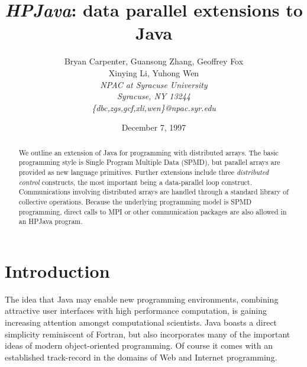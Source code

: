 






\pagestyle{plain}

\title{{\em HPJava}: data parallel extensions to Java}

\author{Bryan Carpenter, Guansong Zhang, Geoffrey Fox \\
        Xinying Li, Yuhong Wen\vspace{5mm} \\
        \em NPAC at Syracuse University \\
        \em Syracuse, NY 13244 \\
        \em \{dbc,zgs,gcf,xli,wen\}@npac.syr.edu}

\date{December 7, 1997}

\maketitle

\begin{abstract}
We outline an extension of Java for programming
with distributed arrays.  The basic programming style is Single Program
Multiple Data (SPMD), but parallel arrays are provided as new language
primitives.  Further extensions include three {\em distributed control}
constructs, the most important being a data-parallel loop construct.
Communications involving distributed arrays are handled through a
standard library of collective operations.  Because the underlying
programming model is SPMD programming, direct calls to MPI or other
communication packages are also allowed in an HPJava program.
\end{abstract}


\section{Introduction}

The idea that Java may enable new programming environments, combining
attractive user interfaces with high performance computation, is gaining
increasing attention amongst computational scientists.  Java boasts a
direct simplicity reminiscent of Fortran, but also incorporates many of
the important ideas of modern object-oriented programming.  Of course
it comes with an established track-record in the domains of Web
and Internet programming.

